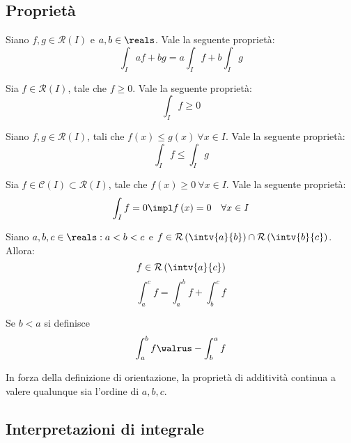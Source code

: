 \subsection{Proprietà}

\begin{theorem}[Linearità]
  Siano $f,g\in\mathcal{R}\left( I \right)$ e $a,b\in\reals$. Vale la seguente proprietà:
  $$\int_I af+bg=a\int_If+b\int_Ig$$
\end{theorem}

\begin{theorem}[Positività]
  Sia $f\in\mathcal{R}\left( I \right)$, tale che $f\ge0$. Vale la seguente proprietà:
  $$\int_If\ge0$$
\end{theorem}

\begin{theorem}[Monotonia]
  Siano $f,g\in\mathcal{R}\left( I \right)$, tali che $f\left( x \right)\le g\left( x \right)\ \forall x\in I$. Vale la seguente proprietà:
  $$\int_If\le\int_Ig$$
\end{theorem}

\begin{theorem}[Annullamento]
  Sia $f\in\mathcal{C}\left( I \right)\subset \mathcal{R}\left( I \right)$, tale che $f\left( x \right)\ge0\ \forall x\in I$. Vale la seguente proprietà:
  $$\int_If=0\impl f\left( x \right)=0\quad \forall x\in I$$
\end{theorem}

\begin{theorem}
  Siano $a,b,c\in\reals:a<b<c$ e $f\in\mathcal{R}\left( \intv{a}{b} \right)\cap \mathcal{R}\left( \intv{b}{c} \right)$. Allora:
  $$f\in\mathcal{R}\left( \intv{a}{c} \right)$$
  $$\int_a^cf=\int_a^bf+\int_b^cf$$
\end{theorem}

\begin{definition}[Orientazione]
  Se $b<a$ si definisce
  $$\int_a^bf\walrus-\int_b^af$$
\end{definition}

\begin{observation}
  In forza della definizione di orientazione, la proprietà di additività continua a valere qualunque sia l'ordine di $a,b,c$.
\end{observation}

\subsection*{Interpretazioni di integrale}


